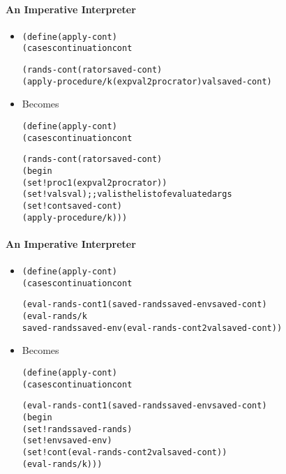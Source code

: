 \documentclass{beamer}
\begin{document}
\begin{frame}[fragile]
\framesubtitle{An Imperative Interpreter}
\begin{scriptsize}
\begin{itemize}
\item<1->
\begin{alltt}
(define (apply-cont)
  (cases continuation cont
    
    (rands-cont (rator saved-cont)
     (apply-procedure/k (expval2proc rator) val saved-cont)
\end{alltt}

\item<1-> Becomes
\begin{alltt}
(define (apply-cont)
  (cases continuation cont
    
    (rands-cont (rator saved-cont)
      (begin
        (set! proc1 (expval2proc rator))
        (set! vals val) ;; val is the list of evaluated args
        (set! cont saved-cont)
        (apply-procedure/k)))
\end{alltt}

\end{itemize}
\end{scriptsize}
\end{frame}

\begin{frame}[fragile]
\framesubtitle{An Imperative Interpreter}
\begin{scriptsize}
\begin{itemize}
\item<1->
\begin{alltt}
(define (apply-cont)
  (cases continuation cont
    
    (eval-rands-cont1 (saved-rands saved-env saved-cont)
     (eval-rands/k 
      saved-rands saved-env (eval-rands-cont2 val saved-cont))
\end{alltt}

\item<1-> Becomes
\begin{alltt}
(define (apply-cont)
  (cases continuation cont
    
    (eval-rands-cont1 (saved-rands saved-env saved-cont)
      (begin
        (set! rands saved-rands)
        (set! env saved-env)
        (set! cont (eval-rands-cont2 val saved-cont))
        (eval-rands/k)))
\end{alltt}

\end{itemize}
\end{scriptsize}
\end{frame}
\end{document}
